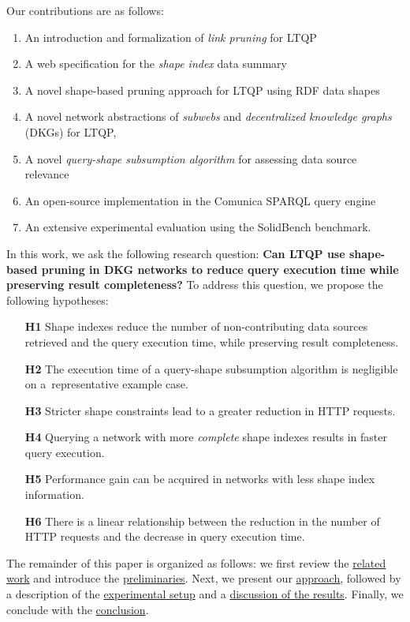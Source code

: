 Our contributions are as follows:
\begin{enumerate}[label=(\roman*)]
    \item An introduction and formalization of \emph{link pruning} for LTQP 
    \item A web specification for the \emph{shape index} data summary
    \item A novel shape-based pruning approach for LTQP using RDF data shapes
    \item A novel network abstractions of \emph{subwebs} and \emph{decentralized knowledge graphs} (DKGs) for LTQP,
    \item A novel \emph{query-shape subsumption algorithm} for assessing data source relevance
    \item An open-source implementation in the Comunica SPARQL query engine~\cite{taelman_iswc_resources_comunica_2018}
    \item An extensive experimental evaluation using the SolidBench benchmark.
\end{enumerate}

In this work, we ask the following research question: 
\textbf{Can LTQP use shape-based pruning in DKG networks to reduce query execution time while preserving result completeness?}
To address this question, we propose the following hypotheses:  

\begin{itemize}
    \item[\textbf{H1}] Shape indexes reduce the number of non-contributing data sources retrieved and the query execution time, while preserving result completeness.
    \item[\textbf{H2}] The execution time of a query-shape subsumption algorithm is negligible  on a~representative example case.
    \item[\textbf{H3}] Stricter shape constraints lead to a greater reduction in HTTP requests.
    \item[\textbf{H4}] Querying a network with more \emph{complete} shape indexes results in faster query execution.
    \item[\textbf{H5}] Performance gain can be acquired in networks with less shape index information.
    \item[\textbf{H6}] There is a linear relationship between the reduction in the number of HTTP requests and the decrease in query execution time.
\end{itemize}

The remainder of this paper is organized as follows: 
we first review the \hyperref[sec:related_work]{related work} and introduce the \hyperref[sec:preliminaries]{preliminaries}. 
Next, we present our \hyperref[sec:approach]{approach}, followed by a description of the \hyperref[sec:experiment]{experimental setup} and a \hyperref[sec:result]{discussion of the results}. 
Finally, we conclude with the \hyperref[sec:conclusion]{conclusion}.
